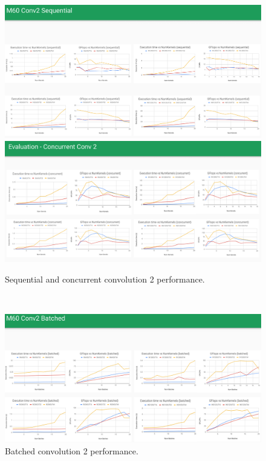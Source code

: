\documentclass[sigconf]{acmart}
\begin{document}
\newpage~\newpage
\begin{figure}[htb]
  \centering
  \includegraphics[width=\textwidth]{img/m60-seq-conv2}
  \includegraphics[width=\textwidth]{img/m60-conc-conv2}
  \caption{Sequential and concurrent convolution 2 performance.}
\end{figure}

\newpage~\newpage
\begin{figure}[htb]
  \centering
  \includegraphics[width=\textwidth]{img/m60-batch-conv2}
  \caption{Batched convolution 2 performance.}
\end{figure}
\end{document}
